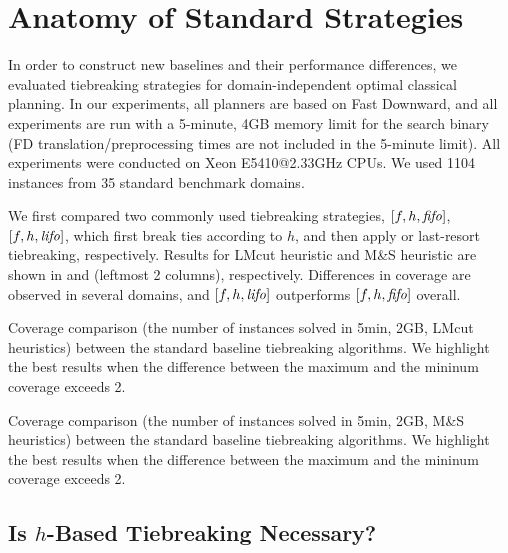 \section{Anatomy of Standard Strategies}
\label{sec:eval-common-strategies}

In order to construct new baselines and their performance differences,
we evaluated tiebreaking strategies for domain-independent optimal
classical planning.  In our experiments, all planners are based on Fast
Downward, and all experiments are run with a 5-minute,
4GB memory limit for the search binary (FD translation/preprocessing
times are not included in the 5-minute limit).  All experiments were
conducted on Xeon E5410@2.33GHz CPUs.  We used 1104 instances from 35
standard benchmark domains.

We first compared two commonly used tiebreaking strategies, $[f,h,{\mbox{\textit{fifo}}}]$, $[f,h,{\mbox{\textit{lifo}}}]$, which
first break ties according to $h$, and then apply \fifo or \lifo
last-resort tiebreaking, respectively.
Results for LMcut heuristic \cite{Helmert2009} and M\&S heuristic \cite{HelmertHHN14} are
shown in  and 
(leftmost 2 columns), respectively.
Differences in coverage are observed in several domains, and
$[f,h,{\mbox{\textit{lifo}}}]$ outperforms $[f,h,{\mbox{\textit{fifo}}}]$ overall.

\begin{table}[htbp]
 {
 \centering
 
 \caption{
 Coverage comparison (the number of instances solved in 5min, 2GB, LMcut
 heuristics) between
 the standard baseline tiebreaking algorithms. We highlight the
 best results when the difference between the maximum and the mininum coverage exceeds 2.
 }
 \label{tbl:lmcut-ipc-full}
 }
\end{table}

\begin{table}[htbp]
 {
 \centering
 
 \caption{
 Coverage comparison (the number of instances solved in 5min, 2GB, M\&S heuristics) between
 the standard baseline tiebreaking algorithms. We highlight the
 best results when the difference between the maximum and the mininum coverage exceeds 2.
 }
 \label{tbl:mands-ipc-full}
 }
\end{table}

\subsection{Is $h$-Based Tiebreaking Necessary?}

